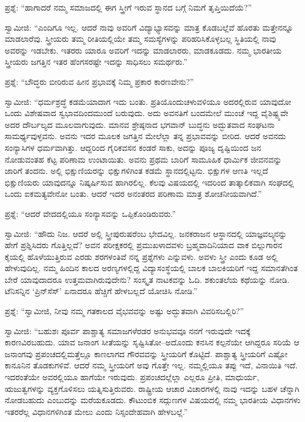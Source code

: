 ಪ್ರಶ್ನೆ: “ಹಾಗಾದರೆ ನಮ್ಮ ಸಮಾಜದಲ್ಲಿ ಈಗ ಸ್ತ್ರೀಗೆ ಇರುವ ಸ್ಥಾನದ ಬಗ್ಗೆ ನಿಮಗೆ ತೃಪ್ತಿಯಿದೆಯೆ?”

ಸ್ವಾಮೀಜಿ: “ಎಂದಿಗೂ ಇಲ್ಲ. ಆದರೆ ನಾವು ಅವರಿಗೆ ವಿದ್ಯಾಭ್ಯಾಸವನ್ನು ಮಾತ್ರ ಕೊಡಬಲ್ಲೆವೆ ಹೊರತು ಮತ್ತೇನನ್ನೂ ಮಾಡಲಾರೆವು. ಸ್ತ್ರೀಯರು ತಮ್ಮ ರೀತಿಯಲ್ಲಿಯೇ ತಮ್ಮ ಸಮಸ್ಯೆಗಳನ್ನು ಪರಿಹರಿಸಿಕೊಳ್ಳಬಲ್ಲ ಸ್ಥಿತಿಯಲ್ಲಿ ನಾವು ಅವರನ್ನು ಇಡಬೇಕು. ಇತರರು ಯಾರೂ ಅವರಿಗೆ ಇದನ್ನು ಮಾಡಲಾರರು, ಮಾಡಕೂಡದು. ನಮ್ಮ ಭಾರತೀಯ ಸ್ತ್ರೀಯರು ಜಗತ್ತಿನ ಇತರ ಹೆಂಗಸರಷ್ಟೇ ಇದನ್ನು ಸಾಧಿಸಲು ಸಮರ್ಥರು.”

ಪ್ರಶ್ನೆ: “ಬೌದ್ಧರು ಬೀರಿರುವ ಹೀನ ಪ್ರಭಾವಕ್ಕೆ ನಿಮ್ಮ ಪ್ರಕಾರ ಕಾರಣವೇನು?”

ಸ್ವಾಮೀಜಿ: “ಧರ್ಮಶ್ರದ್ಧೆ ಕಡಮೆಯಾದಾಗ ಇದು ಬಂತು. ಪ್ರತಿಯೊಂದು\break ಚಳುವಳಿಯೂ ಅದರಲ್ಲಿರುವ ಯಾವುದೋ ಒಂದು ವಿಶೇಷವಾದ ಸ್ವಭಾವದಿಂದ\break ಮುಂದೆ ಬರುವುದು. ಅದು ಅವನತಿಗೆ ಬಂದಮೇಲೆ ಮುಂಚೆ ಇದ್ದ ವೈಶಿಷ್ಟ್ಯವೇ ಅದರ ದೌರ್ಬಲ್ಯದ ಮೂಲವಾಗುವುದು. ಮಾನವ ಶ್ರೇಷ್ಠನಾದ ಭಗವಾನ್​ ಬುದ್ಧನು ಅದ್ಭುತವಾದ ಸಂಘಟನಾ ಸಾಮರ್ಥ್ಯವುಳ್ಳವನು. ಅವನು ಇದರ ಮೂಲಕ ಜಗತ್ತಿನ ಮೇಲೆಲ್ಲಾ ತನ್ನ ಪ್ರಭಾವವನ್ನು ಬೀರಿದ. ಆದರೆ ಅವನದು ಸಂನ್ಯಾಸಿಗಳ ಧರ್ಮವಾಗಿತ್ತು. ಆದ್ದರಿಂದ ಗೈರಿಕವಸನ ಕಂಡರೆ ಸಾಕು, ಅದನ್ನು ಪೂಜ್ಯ ದೃಷ್ಟಿಯಿಂದ ಜನ ನೋಡುವಂತಹ ಕೆಟ್ಟ ಪರಿಣಾಮ ಉಂಟಾಯಿತು. ಅವನು ಪ್ರಥಮ ಬಾರಿಗೆ ಸಾಮೂಹಿಕ ಧಾರ್ಮಿಕ ಜೀವನವನ್ನು ಜಾರಿಗೆ ತಂದನು. ಅಲ್ಲಿ ಭಿಕ್ಷುಣಿಯರನ್ನು ಭಿಕ್ಷುಗಳಿಗಿಂತ ಕಡಮೆ ಸ್ಥಾನದಲ್ಲಿಟ್ಟನು. ಭಿಕ್ಷುಗಳ ಆಣತಿ ಇಲ್ಲದೆ ಭಿಕ್ಷುಣಿಯರು ಯಾವುದನ್ನೂ ನಿಷ್ಕರ್ಷಿಸುವ ಹಾಗಿರಲಿಲ್ಲ. ಕೆಲವು ವಿಷಯದಲ್ಲಿ ಇದರಿಂದ ತಾತ್ಕಾಲಿಕವಾಗಿ ಸಂಘದಲ್ಲಿ ಒಂದು ಐಕಮತ್ಯವೇನೋ ಬಂತು. ಆದರೆ ಇದರ ಅನಂತರದ ಪರಿಣಾಮ ಮಾತ್ರ ಶೋಚನೀಯವಾಗಿದೆ.”

ಪ್ರಶ್ನೆ: “ಆದರೆ ವೇದದಲ್ಲಿಯೂ ಸಂನ್ಯಾಸವನ್ನು ಒಪ್ಪಿಕೊಂಡಿರುವರು.”

ಸ್ವಾಮೀಜಿ: “ಹೌದು ನಿಜ. ಆದರೆ ಅಲ್ಲಿ ಸ್ತ್ರೀಪುರುಷರೆಂಬ ಭೇದವಿಲ್ಲ. ಜನಕರಾಜನ ಆಸ್ಥಾನದಲ್ಲಿ ಯಾಜ್ಞವಲ್ಕ್ಯನನ್ನು ಹೇಗೆ ಪ್ರಶ್ನಿಸಿದರು ಗೊತ್ತಿಲ್ಲವೆ? ಅವನ ಪರೀಕ್ಷಕರಲ್ಲಿ ಪ್ರಮುಖಳಾದವಳು ಬ್ರಹ್ಮವಾದಿನಿಯಾದ ವಾಕ ಬಿಲ್ಲುಗಾರನ ಕೈಯಲ್ಲಿ ಹೊಳೆಯುತ್ತಿರುವ ಎರಡು ಶರಗಳಂತಿವೆ ನನ್ನ ಪ್ರಶ್ನೆಗಳು ಎನ್ನುವಳು. ಅವಳು ಸ್ತ್ರೀ ಎಂದು ಕೂಡ ಅಲ್ಲಿ ಹೇಳುವುದಿಲ್ಲ. ನಮ್ಮ ಹಿಂದಿನ ಕಾಲದ ಅರಣ್ಯಗಳಲ್ಲಿದ್ದ ವಿದ್ಯಾಸಂಸ್ಥೆಯಲ್ಲಿ ಬಾಲಕ ಬಾಲಕಿಯರಿಗೆ ಇದ್ದ ಸಮಾನತೆಗಿಂತ ಬೇರೆ ಯಾವುದಾದರೂ ಉತ್ತಮವಾಗಿರುವುದೇನು? ಸಂಸ್ಕೃತ ನಾಟಕವನ್ನು ಓದಿ. ಶಕುಂತಲೆಯ ಕಥೆಯನ್ನು ನೋಡಿ. ಟೆನಿಸನ್ನಿನ ‘ಪ್ರಿನ್​ಸೆಸ್​’ ಏನಾದರೂ ಹೆಚ್ಚಿಗೆ ಹೇಳಬಲ್ಲದೆ ಯೋಚಿಸಿ ನೋಡಿ.”

ಪ್ರಶ್ನೆ: “ಸ್ವಾಮೀಜಿ, ನೀವು ನಮ್ಮ ಗತಕಾಲದ ವೈಭವವನ್ನು ಅಷ್ಟು ಅದ್ಭುತವಾಗಿ ವಿವರಿಸಬಲ್ಲಿರಿ?”

ಸ್ವಾಮೀಜಿ: “ಬಹುಶಃ ಪೂರ್ವ ಪಾಶ್ಚಾತ್ಯ ಸಮಾಜಗಳೆರಡರ ಅನುಭವವೂ ನನಗೆ ಇರುವುದೇ ಇದಕ್ಕೆ ಕಾರಣವಿರಬಹುದು. ಯಾವ ಜನಾಂಗ ಸೀತೆಯನ್ನು ಸೃಷ್ಟಿಸಿತೋ–ಅದೊಂದು ಕನಸಿನ ಕಲ್ಪನೆಯೇ ಆಗಿದ್ದರೂ ಸರಿಯೆ ಆ ಜನಾಂಗವು ಪ್ರಪಂಚದಲ್ಲಿ\break ಮತ್ತೆಲ್ಲೂ ಕಾಣಲಾಗದ ಗೌರವವನ್ನು ಸ್ತ್ರೀಯರಿಗೆ ಕೊಟ್ಟಿದೆ. ಪಾಶ್ಚಾತ್ಯ ಸ್ತ್ರೀಯರಿಗೆ ಎಷ್ಟೋ ಕಾನೂನಿನ ತೊಡಕುಗಳಿವೆ. ಆದರೆ ನಮ್ಮ ಸ್ತ್ರೀಯರಿಗೆ ಅವು ಗೊತ್ತೇ ಇಲ್ಲ. ನಮ್ಮಲ್ಲಿಯೂ ತಪ್ಪು ಇದೆ, ವಿನಾಯಿತಿ ಇದೆ. ಇದರಂತೆಯೇ ಅವರಲ್ಲಿಯೂ ಹಾಗೆಯೇ ಇರುವುದು. ಪ್ರಪಂಚದಲ್ಲೆಲ್ಲಾ ಎಲ್ಲರೂ ಪ್ರೀತಿ, ಮಾಧುರ್ಯ, ಋಜುತ್ವಗಳನ್ನು ವ್ಯಕ್ತಗೊಳಿಸಲು ಯತ್ನಿಸುತ್ತಿರುವರು. ರಾಷ್ಟ್ರೀಯ ಆಚಾರ ವಿಚಾರಗಳಲ್ಲಿ ನಾವು ಇದನ್ನು ಬಹಳ ಚೆನ್ನಾಗಿ ನೋಡಬಹುದು ಎಂಬುದನ್ನು ಮರೆಯಕೂಡದು. ಕೌಟುಂಬಿಕ ಸದ್ಗುಣಗಳ ವಿಷಯದಲ್ಲಿ ನಮ್ಮ ಭಾರತೀಯ ವಿಧಾನಗಳು ಇತರರೆಲ್ಲ ವಿಧಾನಗಳಿಗಿಂತ ಮೇಲು ಎಂದು ನಿಸ್ಸಂದೇಹವಾಗಿ ಹೇಳಬಲ್ಲೆ.”

